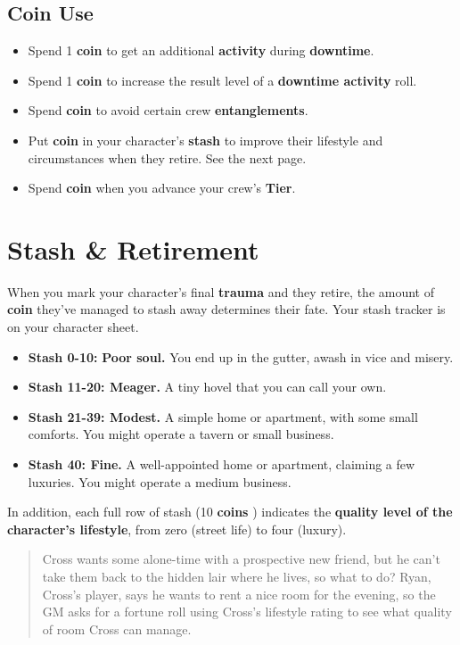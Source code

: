 \documentclass[11pt,fleqn,a5paper]{book}
\newcommand{\gameterm}[1]{\textbf{#1}}
\begin{document}
\subsection{Coin Use}

\begin{itemize}
	\item Spend 1 \gameterm{coin}  to get an additional \textbf{activity} during \textbf{downtime}.
	\item Spend 1 \gameterm{coin}  to increase the result level of a \textbf{downtime activity} roll.
	\item Spend \gameterm{coin}  to avoid certain crew \textbf{entanglements}.
	\item Put \gameterm{coin}  in your character’s \textbf{stash} to improve their lifestyle and circumstances when they retire. See the next page.
	\item Spend \gameterm{coin}  when you advance your crew’s \textbf{Tier}.
\end{itemize}

\section{Stash \& Retirement}

When you mark your character’s final \gameterm{trauma}  and they retire, the amount of \gameterm{coin}  they’ve managed to stash away determines their fate. Your stash tracker is on your character sheet.

\begin{itemize}
	\item \textbf{Stash 0-10:} \textbf{Poor soul. }You end up in the gutter, awash in vice and misery.
	\item \textbf{Stash 11-20: Meager.} A tiny hovel that you can call your own.
	\item \textbf{Stash 21-39: Modest.} A simple home or apartment, with some small comforts. You might operate a tavern or small business.
	\item \textbf{Stash 40: Fine.} A well-appointed home or apartment, claiming a few luxuries. You might operate a medium business.
\end{itemize}

In addition, each full row of stash (10 \gameterm{coins} ) indicates the \textbf{quality level of the character’s lifestyle}, from zero (street life) to four (luxury).

\begin{quote}
	Cross wants some alone-time with a prospective new friend, but he can’t take them back to the hidden lair where he lives, so what to do? Ryan, Cross’s player, says he wants to rent a nice room for the evening, so the GM asks for a fortune roll using Cross’s lifestyle rating to see what quality of room Cross can manage.
\end{quote}
\end{document}
